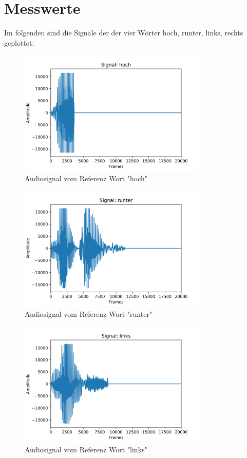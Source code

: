 \documentclass[12pt, oneside, a4paper, \docLanguage]{report}
\begin{document}
\pagebreak

\section{Messwerte}
\label{chap:VERSUCH_2_MESSWERTE}
\begin{normalsize}
Im folgenden sind die Signale der der vier Wörter hoch, runter, links, rechts geplottet:
\begin{figure}[H]
\centering
	\includegraphics[width=0.8\textwidth]{../Images/hoch_signal.png}
	\caption{Audiosignal vom Referenz Wort "hoch"}
\end{figure}

\begin{figure}[H]
\centering
	\includegraphics[width=0.8\textwidth]{../Images/runter_signal.png}
	\caption{Audiosignal vom Referenz Wort "runter"}
\end{figure}

\begin{figure}[H]
\centering
	\includegraphics[width=0.8\textwidth]{../Images/links_signal.png}
	\caption{Audiosignal vom Referenz Wort "links"}
\end{figure}


\end{normalsize}
\end{document}

